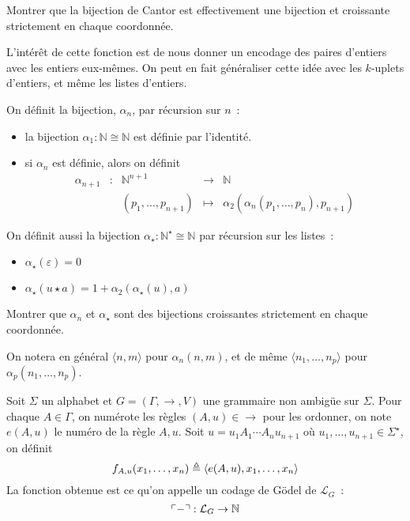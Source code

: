 \begin{exercise}
  Montrer que la bijection de Cantor est effectivement une bijection et
  croissante strictement en chaque coordonnée.
\end{exercise}

L'intérêt de cette fonction est de nous donner un encodage des paires d'entiers
avec les entiers eux-mêmes. On peut en fait généraliser cette idée avec les
$k$-uplets d'entiers, et même les listes d'entiers.

\begin{definition}
  On définit la  bijection, $\alpha_n$, par
  récursion sur $n$~:
  \begin{itemize}
  \item la bijection $\alpha_1 : \mathbb N \cong \mathbb N$ est définie par
    l'identité.
  \item si $\alpha_n$ est définie, alors on définit
    \[\begin{array}{ccccc}
    \alpha_{n+1} & : & \mathbb N^{n+1} & \longrightarrow & \mathbb N\\
    & & (p_1,\ldots,p_{n+1}) & \longmapsto &
    \alpha_2(\alpha_n(p_1,\ldots,p_n),p_{n+1})
    \end{array}\]
  \end{itemize}

  On définit aussi la bijection $\alpha_\star : \mathbb N^\star \cong \mathbb N$
  par récursion sur les listes~:
  \begin{itemize}
  \item $\alpha_\star (\varepsilon) = 0$
  \item $\alpha_\star (u\star a) = 1 + \alpha_2(\alpha_\star(u),a)$
  \end{itemize}
\end{definition}

\begin{exercise}
  Montrer que $\alpha_n$ et $\alpha_\star$ sont des bijections croissantes
  strictement en chaque coordonnée.
\end{exercise}

\begin{notation}
  On notera en général $\langle n,m\rangle$ pour $\alpha_n(n,m)$, et de même
  $\langle n_1,\ldots,n_p\rangle$ pour $\alpha_p(n_1,\ldots,n_p)$.
\end{notation}

\begin{definition}
  Soit $\Sigma$ un alphabet et $G=(\Gamma,\to,V)$ une grammaire non ambigüe sur
  $\Sigma$. Pour chaque $A \in \Gamma$, on numérote les règles $(A,u) \in \to$
  pour les ordonner, on note $e(A,u)$ le numéro de la règle $A,u$. Soit
  $u = u_1A_1\cdots A_nu_{n+1}$ où $u_1,\ldots,u_{n+1}\in\Sigma^\star$, on définit
  \[f_{A,u}(x_1,\ldots,x_n)\triangleq \langle e(A,u),x_1,\ldots,x_n\rangle\]
  La fonction obtenue est ce qu'on appelle un codage de Gödel de
  $\mathcal L_G$~:
  \[\ulcorner-\urcorner : \mathcal L_G \to \mathbb N\]
\end{definition}

